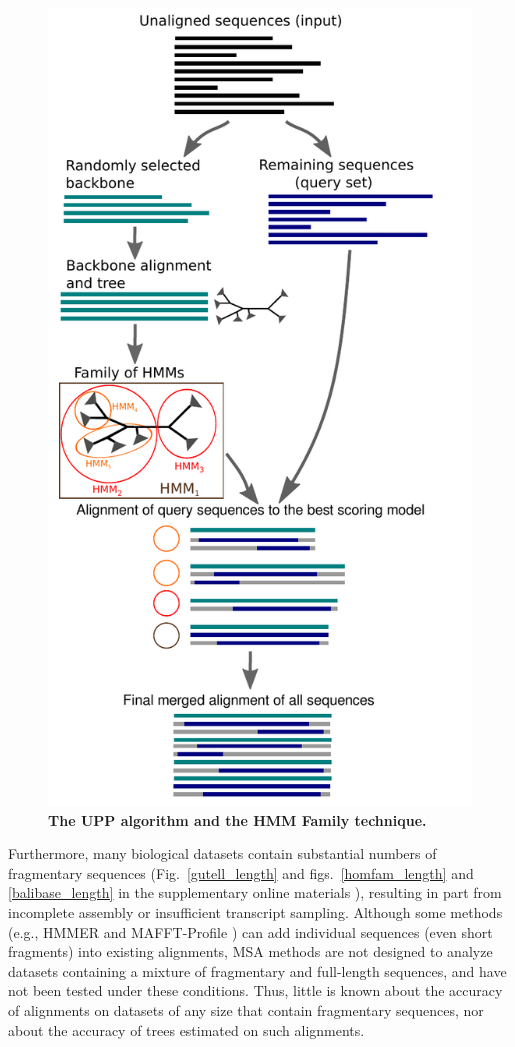 \begin{figure}[htpb]
\centering
\includegraphics[width=.65\linewidth]{upp/diagram}  
\caption[Overview of the UPP algorithm.]{\label{flow_chart}  
{\bf The UPP algorithm and the HMM Family technique.}}
\end{figure}

Furthermore, many biological datasets contain
substantial numbers of 
fragmentary sequences 
(Fig.~\ref{gutell_length} and figs.~\ref{homfam_length}
and \ref{balibase_length} in the
supplementary online materials \cite{SOM}),
resulting in part from incomplete assembly or
insufficient transcript sampling.  %
Although some methods (e.g., HMMER \cite{Eddy1998,HMMER} and MAFFT-Profile \cite{Katoh2012})
can add individual sequences (even short fragments) into existing alignments,
MSA methods are not designed to analyze datasets containing
a mixture of fragmentary and full-length sequences, and
have not been
tested under these conditions.
Thus, little is known about the accuracy of 
alignments on datasets of any size that contain
fragmentary sequences, nor about the accuracy of
trees estimated on such alignments.

